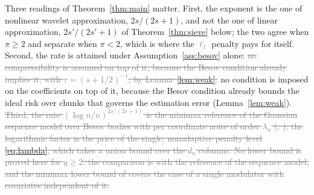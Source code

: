 \documentclass[12pt]{article} %
\theoremstyle{definition}
\theoremstyle{plain}
\newcommand{\penn}{\lambda_{n}}
\newcommand{\seff}{s'}
\begin{document}
Three readings of Theorem~\ref{thm:main} matter. First, the exponent is the
one of nonlinear wavelet approximation, $2s/(2s+1)$, and not the one of
\textcolor{colR1}{linear approximation}, $2\seff/(2\seff+1)$ of Theorem~\ref{thm:sieve} below; the two
agree when $\pi \ge 2$ and separate when $\pi < 2$, which is where the
\textcolor{gray}{\sout{$\ell_1$}} penalty pays for itself. Second, the rate is attained under
Assumption~\ref{ass:besov} alone: \textcolor{gray}{\sout{no compressibility is assumed on top of it,
because the Besov condition already implies it, with
$\tau = (s+1/2)^{-1}$, by Lemma~\mbox{\ref{lem:weak}}.}} \textcolor{colR1}{no condition is imposed
on the coefficients on top of it, because the Besov condition already bounds
the ideal risk over chunks that governs the estimation error
(Lemma~\ref{lem:weak}).} \textcolor{gray}{\sout{Third, the rate
$(\log n/n)^{2s/(2s+1)}$ is the minimax reference of the Gaussian sequence
model over Besov bodies with per coordinate noise of order $\penn$
(\mbox{\citealp[Theorems~4 and~5]{Donoho-Johnstone-1998}};
\mbox{\citealp[Theorem~9.3]{johnstone2019gaussian}}); the logarithmic factor is the price of the
single, nonadaptive penalty level \mbox{\eqref{eq:lambda}}, which takes a union bound
over the $d_n$ columns. No lower bound is proved here for $q \ge 2$: the
comparison is with the reference of the sequence model, and the minimax lower
bound of \mbox{\citet{Klopp-Pensky-2015}} covers the case of a single modulator with
covariates independent of it.}}
\end{document}

